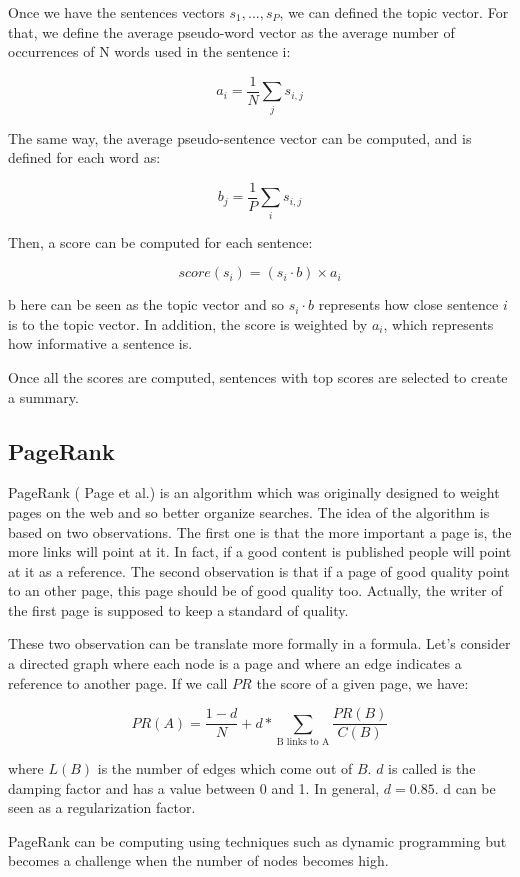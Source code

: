 \documentclass[11pt,a4paper,oldfontcommands]{memoir}
\begin{document}
Once we have the sentences vectors $s_1,...,s_P$, we can defined the topic vector. For that, we define the average pseudo-word vector as the average number of occurrences of N words used in the sentence i:

\[a_i = \frac{1}{N}\sum_j s_{i,j}\]

The same way, the average pseudo-sentence vector can be computed, and is defined for each word as:

\[b_j = \frac{1}{P} \sum_i s_{i,j} \]

Then, a score can be computed for each sentence:

\[score(s_i)=(s_i \cdot b) \times a_i\]

b here can be seen as the topic vector and so $s_i \cdot b$ represents how close sentence $i$ is to the topic vector. In addition, the score is weighted by $a_i$, which represents how informative a sentence is.

Once all the scores are computed, sentences with top scores are selected to create a summary.

\subsection{PageRank}
\label{PageRank}

PageRank (\cite{ilprints422} Page et al.) is an algorithm which was originally designed to weight pages on the web and so better organize searches. The idea of the algorithm is based on two observations. The first one is that the more important a page is, the more links will point at it. In fact, if a good content is published people will point at it as a reference. The second observation is that if a page of good quality point to an other page, this page should be of good quality too. Actually, the writer of the first page is supposed to keep a standard of quality.

These two observation can be translate more formally in a formula. Let's consider a directed graph where each node is a page and where an edge indicates a reference to another page. If we call $PR$ the score of a given page, we have:

\[PR(A) = \frac{1 - d}{N} + d * \sum_{\text{B links to A}}\frac{PR(B)}{C(B)}\]

where $L(B)$ is the number of edges which come out of $B$. $d$ is called is the damping factor and has a value between 0 and 1. In general, $d=0.85$. d can be seen as a regularization factor.

PageRank can be computing using techniques such as dynamic programming but becomes a challenge when the number of nodes becomes high.
\end{document}
